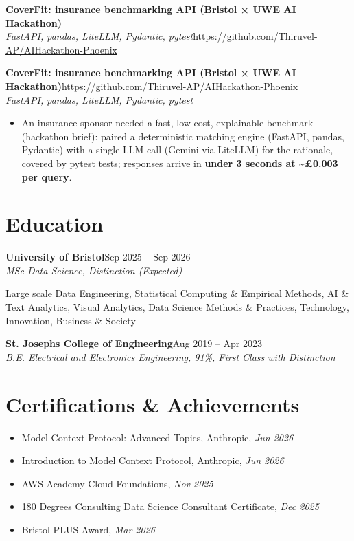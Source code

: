 \documentclass[a4paper,11pt]{article}
\newcommand{\roleNoLoc}[3]{\textbf{#1}\hfill{\color{muted}#2}\\ \textit{#3}\par}
\newcommand{\project}[3]{%
  \textbf{#1}\hfill#3\\ {\color{muted}\small\textit{#2}}\par}
\newcommand{\gap}{\vspace{5pt}}
\newcommand{\num}[1]{\textbf{#1}}   %
\begin{document}
\else
\textbf{CoverFit: insurance benchmarking API (Bristol × UWE AI Hackathon)}\\ {\color{muted}\small\textit{FastAPI, pandas, LiteLLM, Pydantic, pytest}}\hfill{\small\url{https://github.com/Thiruvel-AP/AIHackathon-Phoenix}}\par
\fi
\else
\project{CoverFit: insurance benchmarking API (Bristol × UWE AI Hackathon)}{FastAPI, pandas, LiteLLM, Pydantic, pytest}{\url{https://github.com/Thiruvel-AP/AIHackathon-Phoenix}}
\fi
\begin{itemize}
  \item An insurance sponsor needed a fast, low cost, explainable benchmark (hackathon brief): paired a deterministic matching engine (FastAPI, pandas, Pydantic) with a single LLM call (Gemini via LiteLLM) for the rationale, covered by pytest tests; responses arrive in \num{under 3 seconds at \textasciitilde{}£0.003 per query}.
\end{itemize}

\section{Education}
\roleNoLoc{University of Bristol}{Sep 2025 – Sep 2026}{MSc Data Science, Distinction \textit{(Expected)}}
{\color{muted}\small Large scale Data Engineering, Statistical Computing \& Empirical Methods, AI \& Text Analytics, Visual Analytics, Data Science Methods \& Practices, Technology, Innovation, Business \& Society}\par
\gap
{}
\roleNoLoc{St. Joseph\textquotesingle{}s College of Engineering}{Aug 2019 – Apr 2023}{B.E. Electrical and Electronics Engineering, 91\%, First Class with Distinction}

\section{Certifications \& Achievements}
\begin{itemize}
  \item Model Context Protocol: Advanced Topics, Anthropic, \textit{Jun 2026}
  \item Introduction to Model Context Protocol, Anthropic, \textit{Jun 2026}
  \item AWS Academy Cloud Foundations, \textit{Nov 2025}
  \item 180 Degrees Consulting Data Science Consultant Certificate, \textit{Dec 2025}
  \item Bristol PLUS Award, \textit{Mar 2026}
\end{itemize}
\end{document}
